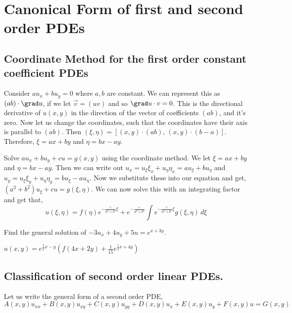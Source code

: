 
\section{Canonical Form of first and second order PDEs}
\subsection{Coordinate Method for the first order constant coefficient PDEs}

Consider $au_x + bu_y = 0$ where $a, b$ are constant. We can represent this as $(a b) \cdot \grad u$, if we let $\vec v = (u v)$ and so $\grad u \cdot v = 0$. This is the directional derivative of $u(x, y)$ in the direction of the vector of coefficients $(a b)$, and it's zero. Now let us change the coordinates, such that the coordinates have their axis is parallel to $(a b)$. Then $(\xi, \eta) = \left[ (x, y) \cdot (a b),\, (x, y) \cdot (b -a) \right]$. Therefore, $\xi = ax + by$ and $\eta = bx - ay$.

\begin{eg}
  Solve $au_x + bu_y + cu = g(x, y)$ using the coordinate method. We let $\xi = ax + by$ and $\eta = bx - ay$. Then we can write out $u_x = u_\xi\xi_x + u_\eta\eta_x = au_\xi + bu_\eta$ and $u_y = u_\xi\xi_y + u_\eta\eta_y = bu_\xi - au_\eta$. Now we substitute these into our equation and get, $(a^2 + b^2)u_\xi + cu = g(\xi, \eta)$. We can now solve this with an integrating factor and get that,
  $$u(\xi, \eta) = f(\eta)e^{-\frac{c}{a^2 + b^2}\xi} + e^{-\frac{c}{a^2 + b^2}}\int e^{-\frac{c}{a^2 + b^2}\xi} g(\xi, \eta)\, d\xi$$
\end{eg}

\begin{exercise}
  Find the general solution of $-3u_x + 4u_y + 5u = e^{x + 3y}$.
\end{exercise}
\begin{solution}
  $u(x, y) = e^{\frac{1}{2}x - y}\left( f(4x + 2y) + \frac{1}{15}e^{\frac{1}{2}x + 4y} \right)$
\end{solution}

\subsection{Classification of second order linear PDEs.}

Let us write the general form of a second order PDE,
$$ A(x, y)u_{xx} + B(x, y)u_{xy} + C(x, y)u_{yy} + D(x, y)u_x + E(x, y)u_y + F(x, y)u = G(x, y) $$

